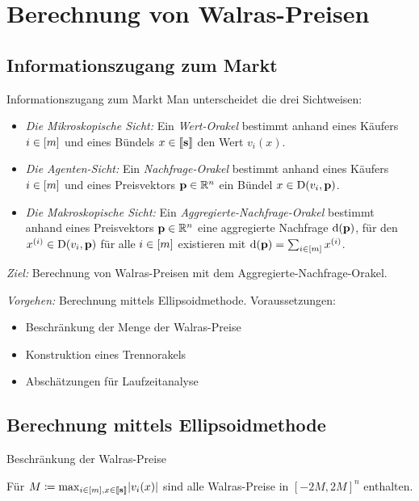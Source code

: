 
\section{Berechnung von Walras-Preisen}
\subsection{Informationszugang zum Markt}
\begin{frame}{Informationszugang zum Markt}
	Man unterscheidet die drei Sichtweisen:
	\begin{itemize}[label=\color{darkblue}$\bullet$]
		\item \emph{Die Mikroskopische Sicht:} Ein \emph{Wert-Orakel} bestimmt anhand eines Käufers $i\in\left[ m \right]$ und eines Bündels $x\in\left\llbracket \mathbf{s} \right\rrbracket$ den Wert $v_i(x)$.
		\item \emph{Die Agenten-Sicht:} Ein \emph{Nachfrage-Orakel} bestimmt anhand eines Käufers $i\in\left[ m \right]$ und eines Preisvektors $\mathbf{p}\in\mathbb{R}^n$ ein Bündel $x\in\operatorname{D}(v_i, \mathbf{p})$.
		\item \emph{Die Makroskopische Sicht:} Ein \emph{Aggregierte-Nachfrage-Orakel} bestimmt anhand eines Preisvektors $\mathbf{p}\in\mathbb{R}^n$ eine aggregierte Nachfrage $\operatorname{d}(\mathbf{p})$, für den $x^{(i)}\in\operatorname{D}(v_i, \mathbf{p})$ für alle $i\in\left[ m \right]$ existieren mit $\operatorname{d}(\mathbf{p}) = \sum_{i\in\left[ m \right]} x^{(i)}$.
	\end{itemize}

\vspace{1em}

	\parbox{\textwidth}{\emph{Ziel:} Berechnung von Walras-Preisen mit dem Aggregierte-Nachfrage-Orakel.}
	
\vspace{1em}

	\parbox{\textwidth}{
		\emph{Vorgehen:} Berechnung mittels Ellipsoidmethode. Voraussetzungen:
		\begin{itemize}[label=\color{darkblue}$\bullet$]
			\item Beschränkung der Menge der Walras-Preise
			\item Konstruktion eines Trennorakels
			\item Abschätzungen für Laufzeitanalyse
		\end{itemize}
	}
\end{frame}

\subsection{Berechnung mittels Ellipsoidmethode}
\begin{frame}{Beschränkung der Walras-Preise}
\begin{lemma}
	Für $M\coloneqq \max_{i\in\left[ m \right],x\in\left\llbracket \mathbf{s} \right\rrbracket} \lvert v_i(x)\rvert$ sind alle Walras-Preise in $[-2M, 2M]^n$ enthalten.
\end{lemma}
\end{frame}

